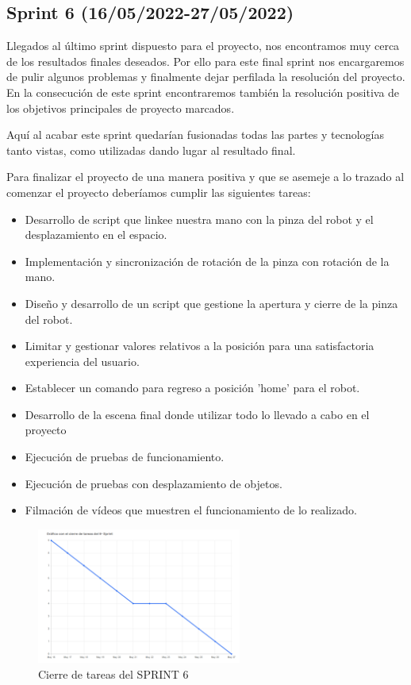 \subsection{\textbf{Sprint 6 (16/05/2022-27/05/2022)}}
Llegados al último sprint dispuesto para el proyecto, nos encontramos muy cerca de los resultados finales deseados. Por ello para este final sprint nos encargaremos de pulir algunos problemas y finalmente dejar perfilada la resolución del proyecto. En la consecución de este sprint encontraremos también la resolución positiva de los objetivos principales de proyecto marcados.

Aquí al acabar este sprint quedarían fusionadas todas las partes y tecnologías tanto vistas, como utilizadas dando lugar al resultado final.

Para finalizar el proyecto de una manera positiva y que se asemeje a lo trazado al comenzar el proyecto deberíamos cumplir las siguientes tareas:
\begin{itemize}
    \item Desarrollo de script que linkee nuestra mano con la pinza del robot y el desplazamiento en el espacio.
    \item Implementación y sincronización de rotación de la pinza con rotación de la mano.
    \item Diseño y desarrollo de un script que gestione la apertura y cierre de la pinza del robot.
    \item Limitar y gestionar valores relativos a la posición para una satisfactoria experiencia del usuario.
    \item Establecer un comando para regreso a posición 'home' para el robot.
    \item Desarrollo de la escena final donde utilizar todo lo llevado a cabo en el proyecto
    \item Ejecución de pruebas de funcionamiento.
    \item Ejecución de pruebas con desplazamiento de objetos.
    \item Filmación de vídeos que muestren el funcionamiento de lo realizado.
\end{itemize}
\newpage
\begin{figure}[h]
\centering
\label{Cierre de tareas del SPRINT 6}
\includegraphics[width=0.6\textwidth]{img/sprint6.PNG}
\caption{Cierre de tareas del SPRINT 6}
\end{figure}
